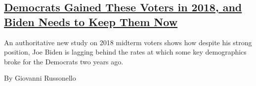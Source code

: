 \begin{enumerate}
{  \subsection{\texorpdfstring{\href{/2020/09/11/us/politics/joe-biden-polling-trump.html}{Democrats
  Gained These Voters in 2018, and Biden Needs to Keep Them
  Now}}{Democrats Gained These Voters in 2018, and Biden Needs to Keep Them Now}}\label{democrats-gained-these-voters-in-2018-and-biden-needs-to-keep-them-now}}

  An authoritative new study on 2018 midterm voters shows how despite
  his strong position, Joe Biden is lagging behind the rates at which
  some key demographics broke for the Democrats two years ago.

  By Giovanni Russonello
\end{enumerate}

